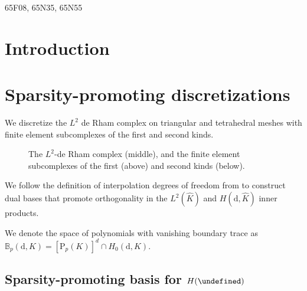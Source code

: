 \documentclass[review,onefignum,onetabnum,a4paper]{siamart190516}
\let\grad\undefined
\let\curl\undefined
\let\div\undefined
\DeclareMathOperator{\grad}{grad}
\DeclareMathOperator{\curl}{curl}
\DeclareMathOperator{\div}{div}
\newcommand{\Hgrad}{H(\grad)}
\newcommand{\Hcurl}{H(\curl)}
\newcommand{\Hdiv}{H(\div)}
\newcommand{\Ltwo}{L^2}
\newcommand{\Khat}{\hat{K}}
\renewcommand{\P}{\mathrm{P}}
\newcommand{\CG}{\mathrm{CG}}
\newcommand{\DG}{\mathrm{DG}}
\newcommand{\Ned}{\mathrm{Ned}^{1}}
\newcommand{\RT}{\mathrm{RT}}
\newcommand{\BDM}{\mathrm{BDM}}
\newcommand{\NedTwo}{\mathrm{Ned}^{2}}
\begin{document}
\begin{AMS}
   65F08, 65N35, 65N55
\end{AMS}


\section{Introduction} \label{sec:introduction}



\section{Sparsity-promoting discretizations} \label{sec:dofs}

We discretize the $\Ltwo$ de Rham complex on triangular and tetrahedral meshes with finite element subcomplexes of the first and second kinds.

\begin{figure}[htbp] 
\centering
{}
\caption{The $\Ltwo$-de Rham complex (middle), and the finite element subcomplexes of the first (above) and second kinds (below).}
\end{figure}


We follow the definition of interpolation degrees of freedom from
\cite{demkowicz00} to construct dual bases that promote orthogonality in the
$\Ltwo(\Khat)$ and $H(\mathrm{d}, \Khat)$ inner products.

We denote the space of polynomials with vanishing boundary trace as
$\mathbb{B}_{p}(\mathrm{d}, K) = [\P_{p}(K)]^d \cap H_0(\mathrm{d}, K)$.

\subsection{Sparsity-promoting basis for $\Hgrad$}
\end{document}
